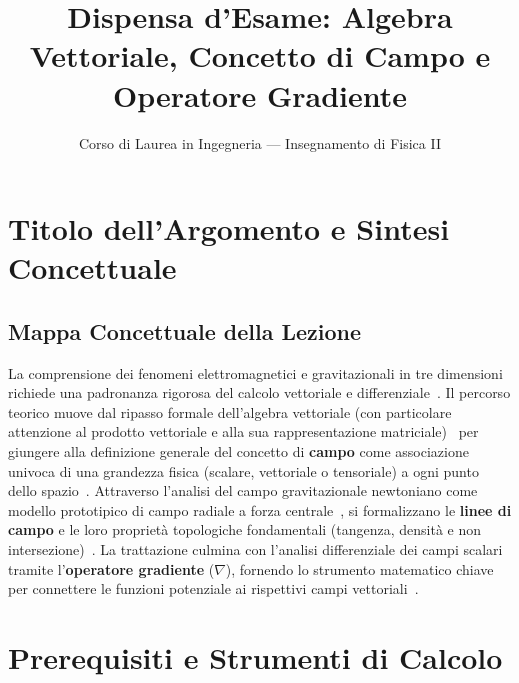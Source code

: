 \documentclass[12pt, a4paper]{article}
\title{\textbf{Dispensa d'Esame: Algebra Vettoriale, Concetto di Campo e Operatore Gradiente}}
\author{Corso di Laurea in Ingegneria --- Insegnamento di Fisica II}
\date{}
\begin{document}
\maketitle

\section{Titolo dell'Argomento e Sintesi Concettuale}

\subsection{Mappa Concettuale della Lezione}
La comprensione dei fenomeni elettromagnetici e gravitazionali in tre dimensioni richiede una padronanza rigorosa del calcolo vettoriale e differenziale~\cite{3}. Il percorso teorico muove dal ripasso formale dell'algebra vettoriale (con particolare attenzione al prodotto vettoriale e alla sua rappresentazione matriciale)~\cite{1, 3} per giungere alla definizione generale del concetto di \textbf{campo} come associazione univoca di una grandezza fisica (scalare, vettoriale o tensoriale) a ogni punto dello spazio~\cite{1}. Attraverso l'analisi del campo gravitazionale newtoniano come modello prototipico di campo radiale a forza centrale~\cite{1, 2}, si formalizzano le \textbf{linee di campo} e le loro proprietà topologiche fondamentali (tangenza, densità e non intersezione)~\cite{2}. La trattazione culmina con l'analisi differenziale dei campi scalari tramite l'\textbf{operatore gradiente} ($\nabla$), fornendo lo strumento matematico chiave per connettere le funzioni potenziale ai rispettivi campi vettoriali~\cite{2}.

\section{Prerequisiti e Strumenti di Calcolo}
\end{document}
